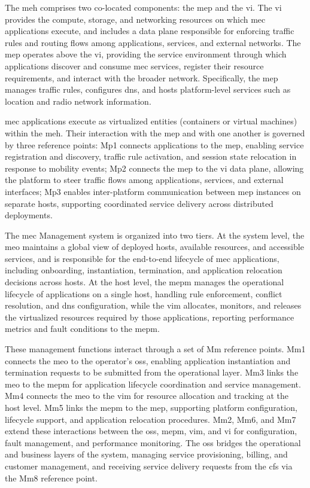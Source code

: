 The \ac{meh} comprises two co-located components: the \ac{mep} and the \ac{vi}. The \ac{vi} provides the compute, storage, and networking resources on which \ac{mec} applications execute, and includes a data plane responsible for enforcing traffic rules and routing flows among applications, services, and external networks. The \ac{mep} operates above the \ac{vi}, providing the service environment through which applications discover and consume \ac{mec} services, register their resource requirements, and interact with the broader network. Specifically, the \ac{mep} manages traffic rules, configures \ac{dns}, and hosts platform-level services such as location and radio network information.

\ac{mec} applications execute as virtualized entities (containers or virtual machines) within the \ac{meh}. Their interaction with the \ac{mep} and with one another is governed by three reference points: Mp1 connects applications to the \ac{mep}, enabling service registration and discovery, traffic rule activation, and session state relocation in response to mobility events; Mp2 connects the \ac{mep} to the \ac{vi} data plane, allowing the platform to steer traffic flows among applications, services, and external interfaces; Mp3 enables inter-platform communication between \ac{mep} instances on separate hosts, supporting coordinated service delivery across distributed deployments.

The \ac{mec} Management system is organized into two tiers. At the system level, the \ac{meo} maintains a global view of deployed hosts, available resources, and accessible services, and is responsible for the end-to-end lifecycle of \ac{mec} applications, including onboarding, instantiation, termination, and application relocation decisions across hosts. At the host level, the \ac{mepm} manages the operational lifecycle of applications on a single host, handling rule enforcement, conflict resolution, and \ac{dns} configuration, while the \ac{vim} allocates, monitors, and releases the virtualized resources required by those applications, reporting performance metrics and fault conditions to the \ac{mepm}.

These management functions interact through a set of Mm reference points. Mm1 connects the \ac{meo} to the operator's \ac{oss}, enabling application instantiation and termination requests to be submitted from the operational layer. Mm3 links the \ac{meo} to the \ac{mepm} for application lifecycle coordination and service management. Mm4 connects the \ac{meo} to the \ac{vim} for resource allocation and tracking at the host level. Mm5 links the \ac{mepm} to the \ac{mep}, supporting platform configuration, lifecycle support, and application relocation procedures. Mm2, Mm6, and Mm7 extend these interactions between the \ac{oss}, \ac{mepm}, \ac{vim}, and \ac{vi} for configuration, fault management, and performance monitoring. The \ac{oss} bridges the operational and business layers of the system, managing service provisioning, billing, and customer management, and receiving service delivery requests from the \ac{cfs} via the Mm8 reference point.

